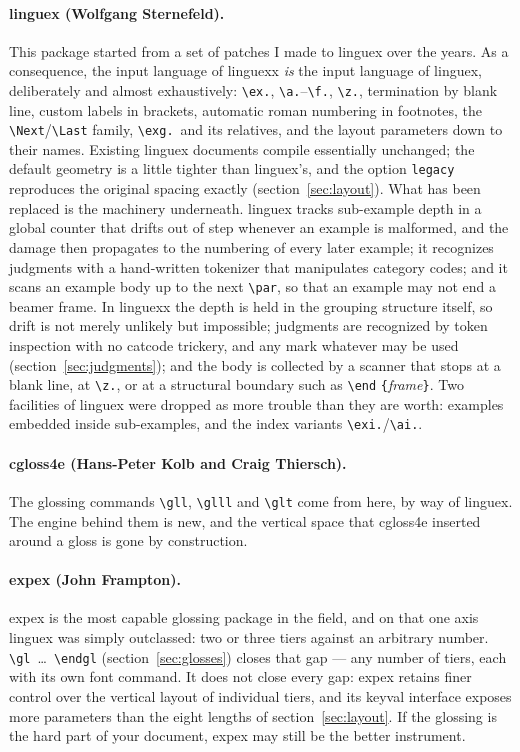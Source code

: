 \documentclass[11pt,a4paper]{article}
\newcommand{\cs}[1]{\texttt{\textbackslash #1}}
\newcommand{\pkg}[2][]{\textsf{#2}}
\newcommand{\opt}[1]{\texttt{#1}}
\newcommand{\meta}[1]{\textrm{\itshape\textlangle#1\textrangle}}
\newcommand{\marg}[1]{\penalty300 \texttt{\{}\meta{#1}\texttt{\}}}
\begin{document}
\paragraph{\pkg{linguex} (Wolfgang Sternefeld).} This package started
from a set of patches I made to \pkg{linguex} over the years. As a
consequence, the input language of \pkg{linguexx} \emph{is} the input
language of \pkg{linguex}, deliberately and almost exhaustively:
\cs{ex.}, \cs{a.}--\cs{f.}, \cs{z.}, termination by blank line, custom
labels in brackets, automatic roman numbering in footnotes, the
\cs{Next}/\cs{Last} family, \cs{exg.}\ and its relatives, and the
layout parameters down to their names. Existing \pkg{linguex}
documents compile essentially unchanged; the default geometry is a
little tighter than \pkg{linguex}'s, and the option \opt{legacy}
reproduces the original spacing exactly (section~\ref{sec:layout}).
What has been replaced is the machinery underneath. \pkg{linguex}
tracks sub-example depth in a global counter that drifts out of step
whenever an example is malformed, and the damage then propagates to
the numbering of every later example; it recognizes judgments with a
hand-written tokenizer that manipulates category codes; and it scans
an example body up to the next \cs{par}, so that an example may not
end a \pkg{beamer} frame. In \pkg{linguexx} the depth is held in the
grouping structure itself, so drift is not merely unlikely but
impossible; judgments are recognized by token inspection with no
catcode trickery, and any mark whatever may be used
(section~\ref{sec:judgments}); and the body is collected by a scanner
that stops at a blank line, at \cs{z.}, or at a structural boundary
such as \cs{end}\marg{frame}. Two facilities of \pkg{linguex} were
dropped as more trouble than they are worth: examples embedded inside
sub-examples, and the index variants \cs{exi.}/\cs{ai.}.

\paragraph{\pkg{cgloss4e} (Hans-Peter Kolb and Craig Thiersch).} The
glossing commands \cs{gll}, \cs{glll} and \cs{glt} come from here, by way
of \pkg{linguex}. The engine behind them is new, and the vertical space
that \pkg{cgloss4e} inserted around a gloss is gone by construction.

\paragraph{\pkg{expex} (John Frampton).} \pkg{expex} is the most capable
glossing package in the field, and on that one axis \pkg{linguex} was
simply outclassed: two or three tiers against an arbitrary number.
\cs{gl}\ \dots\ \cs{endgl} (section~\ref{sec:glosses}) closes that gap ---
any number of tiers, each with its own font command. It does not close
every gap: \pkg{expex} retains finer control over the vertical layout of
individual tiers, and its keyval interface exposes more parameters than
the eight lengths of section~\ref{sec:layout}. If the glossing is the hard
part of your document, \pkg{expex} may still be the better instrument.
\end{document}
